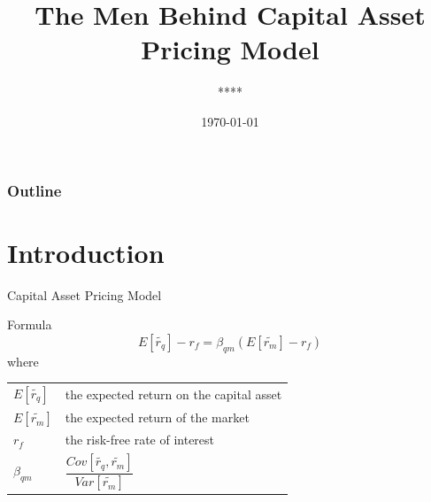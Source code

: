 \documentclass{beamer}
\title[Financial Mathematics Presentation]{The Men Behind
  Capital Asset Pricing Model}
\author[****]{
  ****}
\institute[\wuhao\fontspec{LHANDW.TTF}Zhejiang University]{\sihao\monaco {School of Mathematical Sciences}}
\date[\today]{
   \today}
\begin{document}
\begin{frame}
  \titlepage
\end{frame}

\begin{frame}
  \frametitle{Outline}

  \tableofcontents
\end{frame}

\section{Introduction}
\begin{frame}{Capital Asset Pricing Model}

\begin{block}{Formula}
	$$
	E[\tilde{r_q}]-r_f=\beta_{qm}(E[\tilde{r_m}]-r_f)
	$$
	where
	\begin{longtable}{ll}
		\hline
		$E[\tilde{r_q}]$ & the expected return on the capital asset\\
		$E[\tilde{r_m}]$& the expected return of the market\\
		$r_f$& the risk-free rate of interest\\
		$\beta_{qm}$&$\dfrac{Cov[\tilde{r_q},\tilde{r_m}]}{Var[\tilde{r_m}]}$\\
		\hline
	\end{longtable}
\end{block}	
\end{frame}
\end{document}
